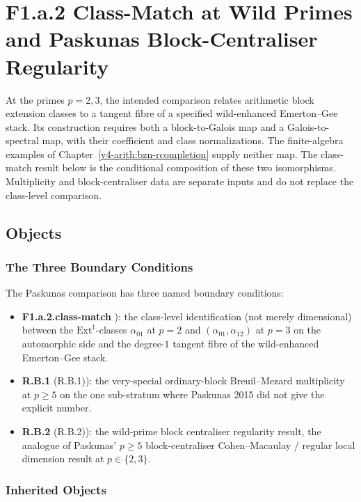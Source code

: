 \chapter{F1.a.2 Class-Match at Wild Primes and Paskunas Block-Centraliser
Regularity}
\label{v4-arith:w6-f:chapter}

At the primes \(p=2,3\), the intended comparison relates
arithmetic block extension classes to a tangent fibre of a specified
wild-enhanced Emerton--Gee stack. Its construction requires both a
block-to-Galois map and a Galois-to-spectral map, with their coefficient
and class normalizations. The finite-algebra examples of
Chapter~\ref{v4-arith:bzn-rcompletion} supply neither map.
The class-match result below is the conditional composition of these
two isomorphisms. Multiplicity and block-centraliser data are separate
inputs and do not replace the class-level comparison.

\section{Objects}
\label{v4-arith:w6-f:domain}

\subsection{The Three Boundary Conditions}

The Paskunas comparison has three named boundary conditions:
\begin{itemize}
\item \textbf{F1.a.2.class-match}
): the class-level
identification (not merely dimensional) between the
\(\mathrm{Ext}^{1}\)-classes \(\alpha_{01}\) at \(p=2\) and
\((\alpha_{01},\alpha_{12})\) at \(p=3\) on the automorphic side and the
degree-\(1\) tangent fibre of the wild-enhanced Emerton--Gee stack.
\item \textbf{R.B.1}
(R.B.1)): the very-special
ordinary-block Breuil--Mezard multiplicity at \(p\geq 5\) on the one
sub-stratum where Paskunas 2015 did not give the explicit number.
\item \textbf{R.B.2}
(R.B.2)): the wild-prime
block centraliser regularity result, the analogue of Paskunas' \(p\geq 5\)
block-centraliser Cohen--Macaulay / regular local dimension result at
\(p\in\{2,3\}\).
\end{itemize}

\subsection{Inherited Objects}

